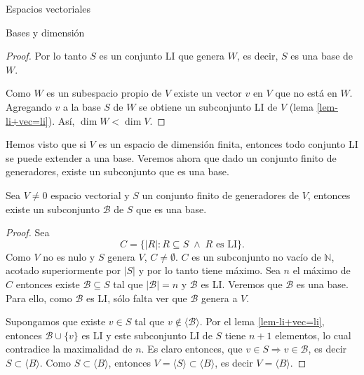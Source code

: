 \begin{chapter}{Espacios vectoriales}
\begin{section}{Bases y dimensi\'on}
\begin{proof}
        Por lo tanto $S$ es un conjunto LI  que genera $W$,  es decir, $S$  es una base de $W$. 
        
        Como $W$ es un subespacio propio de $V$ existe un vector $v$ en $V$ que
        no está en $W$. Agregando $v$ a la base $S$ de $W$ se obtiene un subconjunto
        LI de $V$ (lema \ref{lem-li+vec=li}). Así, $\dim W < \dim V$.
    \end{proof}

Hemos visto que si  $V$  es un espacio de dimensión finita,  entonces todo conjunto LI se puede extender a una base. Veremos ahora que dado un conjunto finito de generadores,  existe un subconjunto que es una base. 


\begin{teorema}\label{gen->base}
    Sea $V \ne 0$ espacio vectorial y $S$ un conjunto finito de generadores de $V$,  entonces existe un subconjunto $\mathcal B$  de $S$ que es una base.  
\end{teorema} 
\begin{proof}
    Sea
    $$
    C = \{|R|: R \subseteq S \;\wedge\; R \text{ es LI}\}.
    $$
    Como $V$ no es nulo  y $S$ genera $V$, $C \ne \emptyset$. $C$  es un subconjunto no vacío de  $\mathbb N$,  acotado superiormente por $|S|$ y por lo tanto tiene máximo. Sea $n$ el máximo de $C$ entonces existe  $\mathcal B \subseteq S$ tal que $|\mathcal B| =n$  y $\mathcal B$ es LI. Veremos que $\mathcal B$  es una base. Para ello, como $\mathcal B $ es LI, sólo falta ver que $\mathcal B$ genera a $V$. 
    
    Supongamos que existe $v \in S$ tal que $ v \not\in \langle \mathcal B \rangle$. Por el lema \ref{lem-li+vec=li},  entonces  $\mathcal B \cup \{v\}$ es LI y este subconjunto LI de $S$ tiene $n+1$  elementos, lo cual contradice la maximalidad de $n$. Es claro entonces, que $v \in S \Rightarrow v \in \mathcal B$,  es decir $S \subset \langle B \rangle$. Como $S \subset \langle B \rangle$,  entonces
    $V = \langle S \rangle \subset \langle B \rangle$, es decir $V =  \langle B \rangle$.
\end{proof}



\end{section}
\end{chapter}
